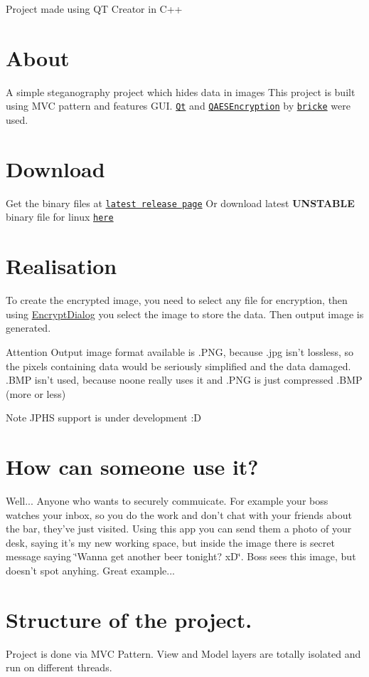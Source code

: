 Project made using Q\-T Creator in C++\hypertarget{index_about}{}\section{About}\label{index_about}
A simple steganography project which hides data in images This project is built using M\-V\-C pattern and features G\-U\-I. \href{https://qt.io}{\tt Qt} and \href{https://github.com/bricke/Qt-AES}{\tt Q\-A\-E\-S\-Encryption} by \href{https://github.com/bricke}{\tt bricke} were used. \hypertarget{index_download}{}\section{Download}\label{index_download}
Get the binary files at \href{https://github.com/waleko/PictureCrypt/releases/latest}{\tt latest release page} Or download latest {\bfseries U\-N\-S\-T\-A\-B\-L\-E} binary file for linux \href{https://github.com/waleko/PictureCrypt/raw/gh-pages/src/build/Release/PictureCrypt}{\tt here} \hypertarget{index_real}{}\section{Realisation}\label{index_real}
To create the encrypted image, you need to select any file for encryption, then using \hyperlink{class_encrypt_dialog}{Encrypt\-Dialog} you select the image to store the data. Then output image is generated. \begin{DoxyAttention}{Attention}
Output image format available is .P\-N\-G, because .jpg isn't lossless, so the pixels containing data would be seriously simplified and the data damaged. .B\-M\-P isn't used, because noone really uses it and .P\-N\-G is just compressed .B\-M\-P (more or less) 
\end{DoxyAttention}
\begin{DoxyNote}{Note}
J\-P\-H\-S support is under development \-:D
\end{DoxyNote}
\hypertarget{index_use}{}\section{How can someone use it?}\label{index_use}
Well... Anyone who wants to securely commuicate. For example your boss watches your inbox, so you do the work and don't chat with your friends about the bar, they've just visited. Using this app you can send them a photo of your desk, saying it's my new working space, but inside the image there is secret message saying \char`\"{}\-Wanna get another beer tonight? x\-D\char`\"{}. Boss sees this image, but doesn't spot anyhing. Great example... \hypertarget{index_structure}{}\section{Structure of the project.}\label{index_structure}
Project is done via M\-V\-C Pattern. View and Model layers are totally isolated and run on different threads.

